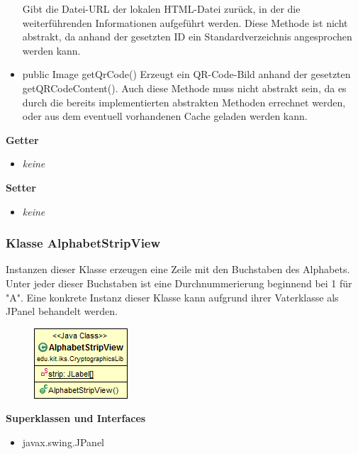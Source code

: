 \documentclass{article}
\begin{document}
\begin{itemize}
          Gibt die Datei-URL der lokalen HTML-Datei zurück, in der die weiterführenden
          Informationen aufgeführt werden. Diese Methode ist nicht abstrakt, da anhand
          der gesetzten ID ein Standardverzeichnis angesprochen werden kann.
        \item public Image getQrCode() \newline
          Erzeugt ein QR-Code-Bild anhand der gesetzten getQRCodeContent(). Auch diese Methode
          muss nicht abstrakt sein, da es durch die bereits implementierten abstrakten Methoden
          errechnet werden, oder aus dem eventuell vorhandenen Cache geladen werden kann.
      \end{itemize}
      
      \textbf{Getter}
      \begin{itemize}
		\item \textit{keine}
      \end{itemize}
      
      \textbf{Setter}
      \begin{itemize}
        \item \textit{keine}
      \end{itemize}
	
	\subsubsection{Klasse AlphabetStripView}
	  Instanzen dieser Klasse erzeugen eine Zeile mit den Buchstaben des Alphabets.
	  Unter jeder dieser Buchstaben ist eine Durchnummerierung beginnend bei 1 für "A".
	  Eine konkrete Instanz dieser Klasse kann aufgrund ihrer Vaterklasse als JPanel behandelt werden.
	
      \begin{figure}[H]
        \centering
        \includegraphics{resources/edu-kit-iks-CryptographicsLib-AlphabetStripView}
      \end{figure}
	
      \textbf{Superklassen und Interfaces}
      \begin{itemize}
        \item javax.swing.JPanel
      \end{itemize}
	
\end{document}
